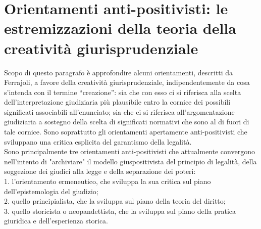\section{Orientamenti anti-positivisti: le estremizzazioni della teoria della creatività giurisprudenziale} %
Scopo di questo paragrafo è approfondire alcuni orientamenti, descritti da Ferrajoli, a favore della creatività giurisprudenziale, indipendentemente da cosa s’intenda con il termine “creazione”: sia che con esso ci si riferisca alla scelta dell’interpretazione giudiziaria più plausibile entro la cornice dei possibili significati associabili all’enunciato; sia che ci si riferisca all’argomentazione giudiziaria a sostegno della scelta di significati normativi che sono al di fuori di tale cornice.
Sono soprattutto gli orientamenti apertamente anti-positivisti che sviluppano una critica esplicita del garantismo della legalità. %
\\Sono principalmente tre orientamenti anti-positivisti  che attualmente convergono nell’intento di "archiviare" il modello giuspositivista del principio di legalità, della soggezione dei giudici alla legge e della separazione dei poteri: 
\\1. l’orientamento ermeneutico, che sviluppa la sua critica sul piano dell’epistemologia del giudizio;
\\2. quello principialista, che la sviluppa sul piano della teoria del diritto; \\3. quello storicista o neopandettista, che la sviluppa sul piano della pratica giuridica e dell’esperienza storica.


